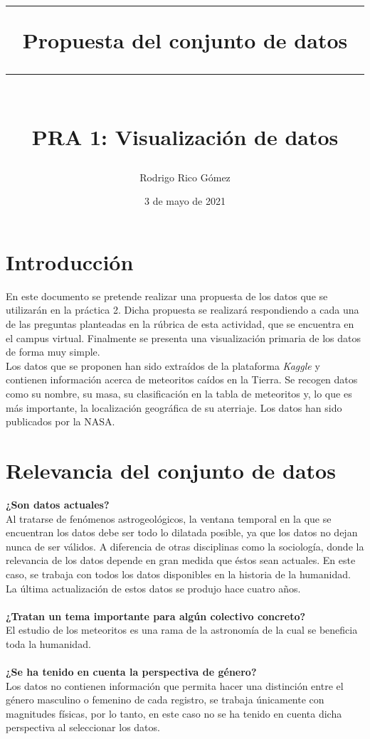 \documentclass[12pt]{article}
\begin{document}
	\title{
		\par\noindent\rule{\textwidth}{0.4pt}
		\textbf{\huge Propuesta del conjunto de datos}
		\par\noindent\rule{\textwidth}{0.4pt}\\{\large PRA 1: Visualización de datos}\\
	}
	\author{Rodrigo Rico Gómez}
	\date{3 de mayo de 2021}
	\maketitle
	\clearpage
	\section{Introducción}
    En este documento se pretende realizar una propuesta de los datos que se utilizarán en la práctica 2. Dicha propuesta se realizará respondiendo a cada una de las preguntas planteadas en la rúbrica de esta actividad, que se encuentra en el campus virtual. Finalmente se presenta una visualización primaria de los datos de forma muy simple.\\
    Los datos que se proponen han sido extraídos de la plataforma \textit{Kaggle} y contienen información acerca de meteoritos caídos en la Tierra. Se recogen datos como su nombre, su masa, su clasificación en la tabla de meteoritos y, lo que es más importante, la localización geográfica de su aterriaje. Los datos han sido publicados por la NASA.
    \section{Relevancia del conjunto de datos}
	\textbf{¿Son datos actuales?}\\
    Al tratarse de fenómenos astrogeológicos, la ventana temporal en la que se encuentran los datos debe ser todo lo dilatada posible, ya que los datos no dejan nunca de ser válidos. A diferencia de otras disciplinas como la sociología, donde la relevancia de los datos depende en gran medida que éstos sean actuales. En este caso, se trabaja con todos los datos disponibles en la historia de la humanidad. La última actualización de estos datos se produjo hace cuatro años.\\
    \\
    \textbf{¿Tratan un tema importante para algún colectivo concreto?}\\
    El estudio de los meteoritos es una rama de la astronomía de la cual se beneficia toda la humanidad.\\
    \\
    \textbf{¿Se ha tenido en cuenta la perspectiva de género?}\\
    Los datos no contienen información que permita hacer una distinción entre el género masculino o femenino de cada registro, se trabaja únicamente con magnitudes físicas, por lo tanto, en este caso no se ha tenido en cuenta dicha perspectiva al seleccionar los datos.
\end{document}
